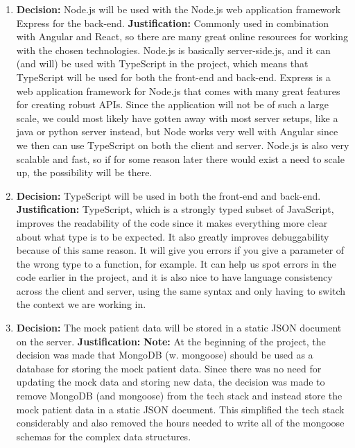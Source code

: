\documentclass[10pt,a4paper]{article}
\begin{document}
\begin{enumerate}
    \item \textbf{Decision:} Node.js will be used with the Node.js web application framework Express for the back-end.
    \linebreak{}
    \textbf{Justification:} Commonly used in combination with Angular and React, so there are many great online resources for working with the chosen technologies. Node.js is basically server-side.js, and it can (and will) be used with TypeScript in the project, which means that TypeScript will be used for both the front-end and back-end. Express is a web application framework for Node.js that comes with many great features for creating robust APIs. Since the application will not be of such a large scale, we could most likely have gotten away with most server setups, like a java or python server instead, but Node works very well with Angular since we then can use TypeScript on both the client and server. Node.js is also very scalable and fast, so if for some reason later there would exist a need to scale up, the possibility will be there.
    
     \item \textbf{Decision:} TypeScript will be used in both the front-end and back-end.
    \linebreak{}
    \textbf{Justification:} TypeScript, which is a strongly typed subset of JavaScript, improves the readability of the code since it makes everything more clear about what type is to be expected. It also greatly improves debuggability because of this same reason. It will give you errors if you give a parameter of the wrong type to a function, for example. It can help us spot errors in the code earlier in the project, and it is also nice to have language consistency across the client and server, using the same syntax and only having to switch the context we are working in. 
    
     \item \textbf{Decision:} The mock patient data will be stored in a static JSON document on the server.
    \linebreak{}
    \textbf{Justification:} \textbf{Note:} At the beginning of the project, the decision was made that MongoDB (w. mongoose) should be used as a database for storing the mock patient data. Since there was no need for updating the mock data and storing new data, the decision was made to remove MongoDB (and mongoose) from the tech stack and instead store the mock patient data in a static JSON document. This simplified the tech stack considerably and also removed the hours needed to write all of the mongoose schemas for the complex data structures.
    

\end{enumerate}
\end{document}
